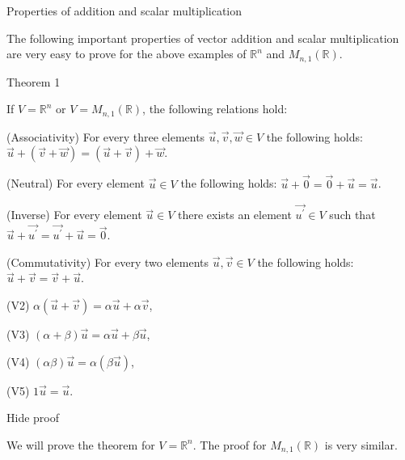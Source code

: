 Properties of addition and scalar multiplication

The following important properties of vector addition and scalar multiplication are very easy to prove for the above examples of \( \mathbb R^n \) and \( M_{n,1}(\mathbb R) \).

Theorem 1


If \( V=\mathbb R^n \) or \( V=M_{n,1}(\mathbb R) \), the following relations hold:

    (Associativity) For every three elements \( \overrightarrow u, \overrightarrow v, \overrightarrow w\in V \) the following holds: \( \overrightarrow u+(\overrightarrow v+\overrightarrow w)=(\overrightarrow u+\overrightarrow v)+\overrightarrow w \).

    (Neutral) For every element \( \overrightarrow u\in V \) the following holds: \( \overrightarrow u+\overrightarrow 0=\overrightarrow 0+\overrightarrow u=\overrightarrow u \).

    (Inverse) For every element \( \overrightarrow u\in V \) there exists an element \( \overrightarrow{u^{\prime}}\in V \) such that \( \overrightarrow u+\overrightarrow{u^{\prime}}=\overrightarrow{u^{\prime}}+\overrightarrow u=\overrightarrow 0 \).

    (Commutativity) For every two elements \( \overrightarrow u,\overrightarrow v\in V \) the following holds: \( \overrightarrow u+\overrightarrow v=\overrightarrow v+\overrightarrow u \).

    (V2) \( \alpha(\overrightarrow u+\overrightarrow v)=\alpha \overrightarrow u+\alpha \overrightarrow v \),

    (V3) \( (\alpha+\beta)\overrightarrow u=\alpha \overrightarrow u+\beta \overrightarrow u \),

    (V4) \( (\alpha\beta)\overrightarrow u=\alpha (\beta \overrightarrow u) \),

    (V5) \( 1\overrightarrow u=\overrightarrow u \).

Hide proof

We will prove the theorem for \( V=\mathbb R^n \). The proof for \( M_{n,1}(\mathbb R) \) is very similar.

